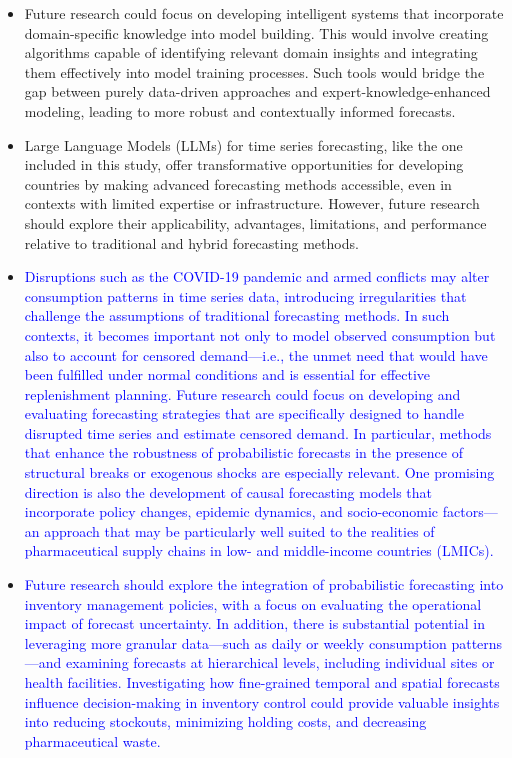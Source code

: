 \documentclass[
  authoryear,
  preprint,
  3p]{elsarticle}
\begin{document}
\begin{itemize}
\item
  Future research could focus on developing intelligent systems that
  incorporate domain-specific knowledge into model building. This would
  involve creating algorithms capable of identifying relevant domain
  insights and integrating them effectively into model training
  processes. Such tools would bridge the gap between purely data-driven
  approaches and expert-knowledge-enhanced modeling, leading to more
  robust and contextually informed forecasts.
\item
  Large Language Models (LLMs) for time series forecasting, like the one
  included in this study, offer transformative opportunities for
  developing countries by making advanced forecasting methods
  accessible, even in contexts with limited expertise or infrastructure.
  However, future research should explore their applicability,
  advantages, limitations, and performance relative to traditional and
  hybrid forecasting methods.
\item
  \textcolor{blue}{Disruptions such as the COVID-19 pandemic and armed conflicts may alter consumption patterns in time series data, introducing irregularities that challenge the assumptions of traditional forecasting methods. In such contexts, it becomes important not only to model observed consumption but also to account for censored demand—i.e., the unmet need that would have been fulfilled under normal conditions and is essential for effective replenishment planning. Future research could focus on developing and evaluating forecasting strategies that are specifically designed to handle disrupted time series and estimate censored demand. In particular, methods that enhance the robustness of probabilistic forecasts in the presence of structural breaks or exogenous shocks are especially relevant. One promising direction is also the development of causal forecasting models that incorporate policy changes, epidemic dynamics, and socio-economic factors—an approach that may be particularly well suited to the realities of pharmaceutical supply chains in low- and middle-income countries (LMICs).}
\item
  \textcolor{blue}{Future research should explore the integration of probabilistic forecasting into inventory management policies, with a focus on evaluating the operational impact of forecast uncertainty. In addition, there is substantial potential in leveraging more granular data—such as daily or weekly consumption patterns—and examining forecasts at hierarchical levels, including individual sites or health facilities. Investigating how fine-grained temporal and spatial forecasts influence decision-making in inventory control could provide valuable insights into reducing stockouts, minimizing holding costs, and decreasing pharmaceutical waste.}
\end{itemize}
\end{document}
